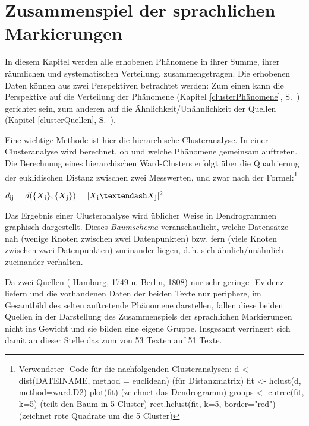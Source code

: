 \chapter{Zusammenspiel der sprachlichen Markierungen}\label{zusammenspiel}
In diesem Kapitel werden alle erhobenen Phänomene in ihrer Summe, ihrer räumlichen und systematischen Verteilung, zusammengetragen. Die erhobenen Daten können aus zwei Perspektiven betrachtet werden: Zum einen kann die Perspektive auf die Verteilung der Phänomene (Kapitel \ref{clusterPhänomene}, S.\, \pageref{clusterPhänomene}) gerichtet sein, zum anderen auf die Ähnlichkeit/Unähnlichkeit der Quellen (Kapitel \ref{clusterQuellen}, S.\, \pageref{clusterQuellen}). 

Eine wichtige Methode ist hier die hierarchische Clusteranalyse. In einer Clusteranalyse wird berechnet, ob und welche Phänomene gemeinsam auftreten. Die Berechnung eines hierarchischen Ward-Clusters erfolgt über die Quadrierung der euklidischen Distanz zwischen zwei Messwerten, und zwar nach der Formel:\footnote{Verwendeter -Code für die nachfolgenden Clusteranalysen: {\ttfamily \scriptsize{d <- dist(DATEINAME, method = \grqq euclidean\grqq) (für Distanzmatrix) 
fit <- hclust(d, method=\grqq ward.D2\grqq)
 plot(fit) (zeichnet das Dendrogramm)
groups <- cutree(fit, k=5) (teilt den Baum in 5 Cluster) 
rect.hclust(fit, k=5, border="red") (zeichnet rote Quadrate um die 5 Cluster)}}}

\begin{center}\begin{math}
d\textsubscript{ij} = d(\{X\textsubscript{i}\}, \{X\textsubscript{j}\}) = |X\textsubscript{i} – X\textsubscript{j} |^2 
\end{math}
\end{center} 
\vspace{0.2cm}

Das Ergebnis einer Clusteranalyse wird üblicher Weise in Dendrogrammen graphisch dargestellt. Dieses \textit{Baumschema} veranschaulicht, welche Datensätze nah (wenige Knoten zwischen zwei Datenpunkten) bzw. fern (viele Knoten zwischen zwei Datenpunkten) zueinander liegen, d.\,h. sich ähnlich/unähnlich zueinander verhalten.

Da zwei Quellen ( Hamburg, 1749 u.  Berlin, 1808) nur sehr geringe \hai{{\LiJi}}-Evidenz liefern und die vorhandenen Daten der beiden Texte nur periphere, im Gesamtbild des \hai{{\LiJi}} selten auftretende Phänomene darstellen, fallen diese beiden Quellen in der Darstellung des Zusammenspiels der sprachlichen Markierungen nicht ins Gewicht und sie bilden eine eigene Gruppe. Insgesamt verringert sich damit an dieser Stelle das  zum  von 53 Texten auf 51 Texte.

